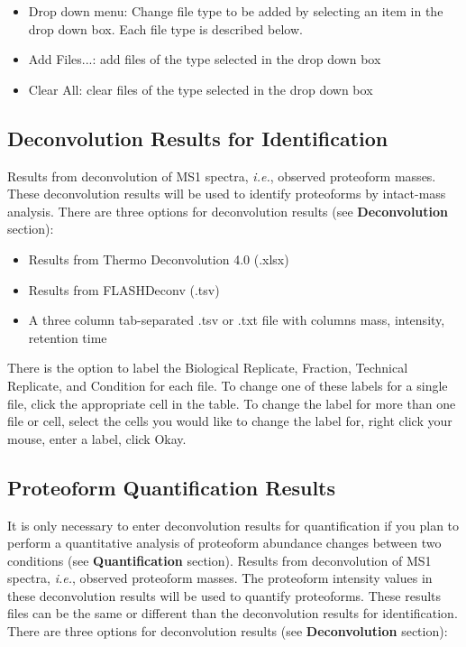 \begin{itemize}
	\item Drop down menu: Change file type to be added by selecting an item in the drop down box. Each file type is described below. 
	\item Add Files...: add files of the type selected in the drop down box
	\item Clear All: clear files of the type selected in the drop down box
\end{itemize}
\pagebreak
\subsection{Deconvolution Results for Identification}

Results from deconvolution of MS1 spectra, \textit{i.e.}, observed proteoform masses. These deconvolution results will be used to identify proteoforms by intact-mass analysis. There are three options for deconvolution results (see \textbf{Deconvolution} section):

\begin{itemize}
	\item Results from Thermo Deconvolution 4.0 (.xlsx)
	\item Results from FLASHDeconv (.tsv)
	\item A three column tab-separated .tsv or .txt file with columns mass, intensity, retention time
\end{itemize}

There is the option to label the Biological Replicate, Fraction, Technical Replicate, and Condition for each file. To change one of these labels for a single file, click the appropriate cell in the table. To change the label for more than one file or cell, select the cells you would like to change the label for, right click your mouse, enter a label, click Okay. 

\subsection{Proteoform Quantification Results}

It is only necessary to enter deconvolution results for quantification if you plan to perform a quantitative analysis of proteoform abundance changes between two conditions (see \textbf{Quantification} section). Results from deconvolution of MS1 spectra, \textit{i.e.}, observed proteoform masses. The proteoform intensity values in these deconvolution results will be used to quantify proteoforms.\supercite{Cesnik2018,Schaffer2018} These results files can be the same or different than the deconvolution results for identification.  There are three options for deconvolution results (see \textbf{Deconvolution} section):

